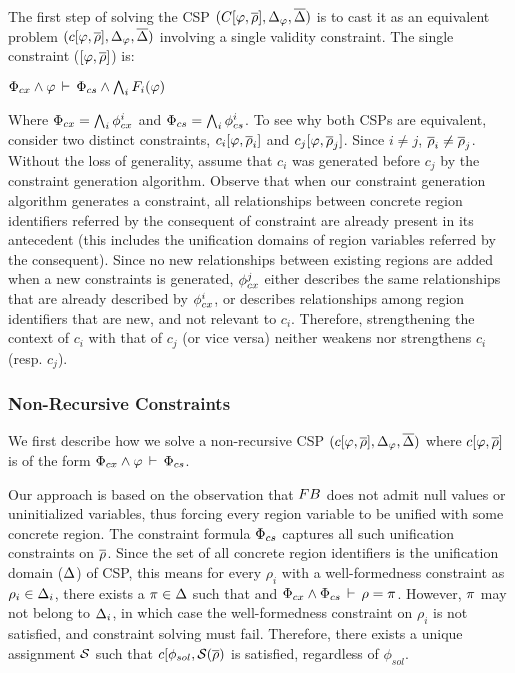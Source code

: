 The first step of solving the CSP $(C\lbrack \varphi,\overline{\rho} \rbrack,\Delta_{\varphi}, \overline{\Delta})$ is to cast it as an
equivalent problem $(c\lbrack \varphi,\overline{\rho} \rbrack,\Delta_{\varphi},\overline{\Delta})$ involving a single validity constraint. The
single constraint ($\lbrack \varphi,\overline{\rho} \rbrack$) is:
\begin{center}
\(
  \Phi_{cx} \wedge \varphi\,\vdash\,\Phi_{cs} \wedge  \bigwedge_i F_i(\varphi)
\)
\end{center}
Where $\Phi_{cx} = \bigwedge_i \phi_{cx}^{i}$ and $\Phi_{cs} = \bigwedge_i
\phi_{cs}^{i}$. To see why both CSPs are equivalent, consider two
distinct constraints, $c_i\lbrack \varphi,\overline{\rho}_i \rbrack$ and
$c_j\lbrack \varphi,\overline{\rho}_j \rbrack$. Since $i\neq j$, $\overline{\rho}_i
\neq \overline{\rho}_j$. Without the loss of generality, assume that $c_i$ was
generated before $c_j$ by the constraint generation algorithm. Observe
that when our constraint generation algorithm generates a constraint,
all relationships between concrete region identifiers referred by the
consequent of constraint are already present in its antecedent (this
includes the unification domains of region variables referred by the
consequent).  Since no new relationships between existing regions are
added when a new constraints is generated, $\phi_{cx}^j$ either
describes the same relationships that are already described by
$\phi_{cx}^i$, or describes relationships among region identifiers that
are new, and not relevant to $c_i$. Therefore, strengthening the
context of $c_i$ with that of $c_j$ (or vice versa) neither weakens
nor strengthens $c_i$ (resp.  $c_j$).

\subsubsection{Non-Recursive Constraints}
\label{sec:csolve}

We first describe how we solve a non-recursive CSP $(c\lbrack \varphi,\overline{\rho} \rbrack,\Delta_{\varphi},\overline{\Delta})$ where
$c\lbrack \varphi,\overline{\rho} \rbrack$ is of the form $\Phi_{cx}
\wedge \varphi\,\vdash\,\Phi_{cs}$. 

Our approach is based on the observation that ${\sc FB}$ does not admit
null values or uninitialized variables, thus forcing every region
variable to be unified with some concrete region. The constraint
formula $\Phi_{cs}$ captures all such unification constraints on
$\overline{\rho}$. Since the set of all concrete region identifiers is the
unification domain ($\Delta$) of CSP, this means for every $\rho_i$
with a well-formedness constraint as $\rho_i \in \Delta_i$, there
exists a $\pi \in \Delta$ such that and $\Phi_{cx} \wedge
\Phi_{cs}\,\vdash\,\rho = \pi$. However, $\pi$ may not belong to $\Delta_i$,
in which case the well-formedness constraint on $\rho_i$ is not
satisfied, and constraint solving must fail.  Therefore, there exists
a unique assignment $\mathcal{S}$ such that $c\lbrack
\phi_{sol},\mathcal{S}(\overline{\rho})$ is satisfied, regardless of
$\phi_{sol}$.

